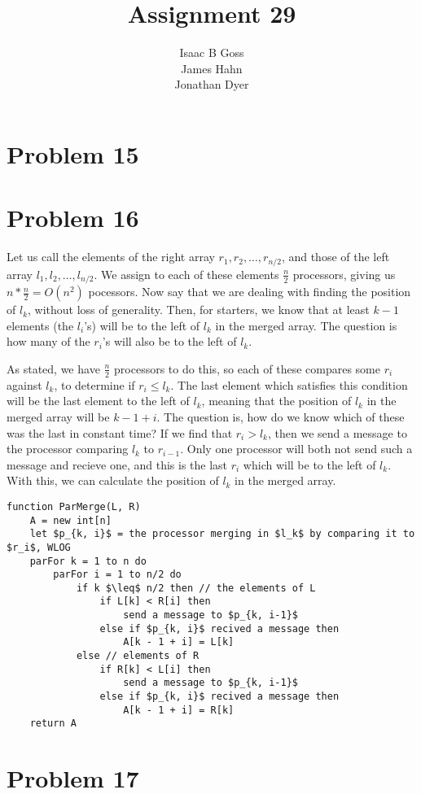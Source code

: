 \documentclass{article}
\author{Isaac B Goss\\ James Hahn\\ Jonathan Dyer}
\title{Assignment 29}
\providecommand{\prob}[1]{\section*{Problem #1}}
\begin{document}
\maketitle

\prob{15}

\prob{16}
Let us call the elements of the right array $r_1, r_2, \dots, r_{n/2}$, and those of the left array $l_1, l_2, \dots, l_{n/2}$.
We assign to each of these elements $\frac{n}{2}$ processors, giving us $n * \frac{n}{2} = O(n^2)$ pocessors.
Now say that we are dealing with finding the position of $l_k$, without loss of generality.
Then, for starters, we know that at least $k-1$ elements (the $l_i$'s) will be to the left of $l_k$ in the merged array.
The question is how many of the $r_i$'s will also be to the left of $l_k$.

As stated, we have $\frac{n}{2}$ processors to do this, so each of these compares some $r_i$ against $l_k$, to determine if $r_i \leq l_k$.
The last element which satisfies this condition will be the last element to the left of $l_k$, meaning that the position of $l_k$ in the merged array will be $k - 1 + i$.
The question is, how do we know which of these was the last in constant time?
If we find that $r_i > l_k$, then we send a message to the processor comparing $l_k$ to $r_{i-1}$.
Only one processor will both not send such a message and recieve one, and this is the last $r_i$ which will be to the left of $l_k$.
With this, we can calculate the position of $l_k$ in the merged array.

\begin{lstlisting}
function ParMerge(L, R)
    A = new int[n]
    let $p_{k, i}$ = the processor merging in $l_k$ by comparing it to $r_i$, WLOG
    parFor k = 1 to n do
        parFor i = 1 to n/2 do
            if k $\leq$ n/2 then // the elements of L
                if L[k] < R[i] then
                    send a message to $p_{k, i-1}$
                else if $p_{k, i}$ recived a message then
                    A[k - 1 + i] = L[k]
            else // elements of R
                if R[k] < L[i] then
                    send a message to $p_{k, i-1}$
                else if $p_{k, i}$ recived a message then
                    A[k - 1 + i] = R[k]
    return A
\end{lstlisting}

\prob{17}
\end{document}
